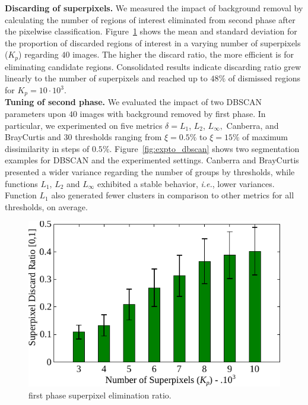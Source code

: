 \noindent
\textbf{Discarding of superpixels.}
We measured the impact of background removal by calculating the number of regions of interest eliminated from \system second phase after the pixelwise classification.
Figure~\ref{fig:efic} shows the mean and standard deviation for the proportion of discarded regions of interest in a varying number of superpixels ($K_p$) regarding $40$ images.
The higher the discard ratio, the more efficient is \system for eliminating candidate regions.
Consolidated results indicate discarding ratio grew linearly to the number of superpixels and reached up to $48\%$ of dismissed regions for $K_p = 10 \cdot 10^3$.\\

\noindent
\textbf{Tuning of \system second phase.}
We evaluated the impact of two DBSCAN parameters upon $40$ \dataset images with background removed by \system first phase.
In particular, we experimented on five metrics $\delta = L_1$, $L_2$, $L_\infty,$ Canberra, and BrayCurtis and $30$ thresholds ranging from $\xi = 0.5\%$ to $\xi = 15\%$ of maximum dissimilarity in steps of $0.5\%$.
Figure~\ref{fig:expto_dbscan} shows two segmentation examples for DBSCAN and the experimented settings.
Canberra and BrayCurtis presented a wider variance regarding the number of groups by thresholds, while functions $L_1$, $L_2$ and $L_\infty$ exhibited a stable behavior, \textit{i.e.}, lower variances. 
Function $L_1$ also generated fewer clusters in comparison to other metrics for all thresholds, on average.

\begin{figure}[!htb]
\centering
\includegraphics[scale=.68]{figs/efic.pdf}
\vspace{-8px}
\caption{\system first phase superpixel elimination ratio.}
\label{fig:efic}
\end{figure}

